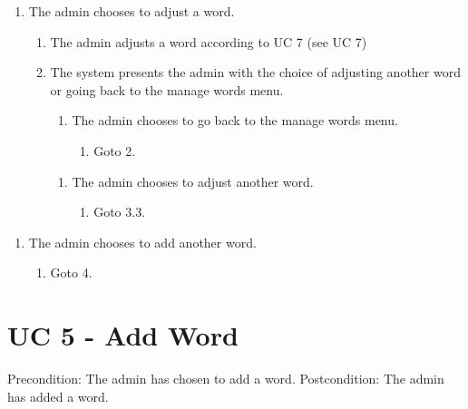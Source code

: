 \documentclass[12pt, letterpaper]{article}
\begin{document}
\begin{enumerate}[label=3.3.]
	\item The admin chooses to adjust a word. 
	\begin{enumerate}[label=3.3.\arabic*]
		\item The admin adjusts a word according to UC 7 (see UC 7)
		\item The system presents the admin with the choice of adjusting another word or going back to the manage words menu.
		\begin{enumerate}[label=3.3.2.a]
			\item The admin chooses to go back to the manage words menu.
			\begin{enumerate}[label=3.3.2.a.1]
				\item Goto 2.
			\end{enumerate}
		\end{enumerate}
		\begin{enumerate}[label=3.3.2.b]
			\item The admin chooses to adjust another word.
			\begin{enumerate}[label=3.3.2.b.1]
				\item Goto 3.3.
			\end{enumerate}
		\end{enumerate}
	\end{enumerate}
\end{enumerate}
\begin{enumerate}[label=6.1.]
	\item The admin chooses to add another word. 
	\begin{enumerate}[label=6.1.\arabic*]
		\item Goto 4.
	\end{enumerate}
\end{enumerate}
\section{UC 5 - Add Word}
Precondition: The admin has chosen to add a word.
\newline
Postcondition: The admin has added a word.
\end{document}
